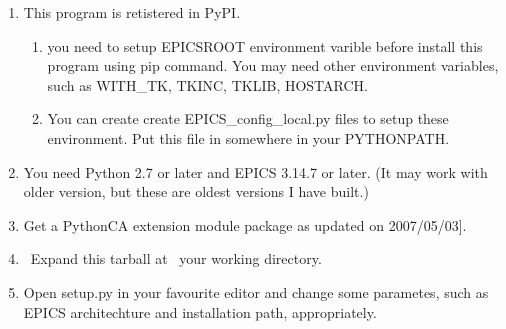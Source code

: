 \documentclass[a4paper,12pt,dvipdfmx]{sphinxhowto}
\begin{document}
\begin{enumerate}
%
\item {} 
\sphinxAtStartPar
This program is retistered in PyPI.
\begin{enumerate}
%
\item {} 
\sphinxAtStartPar
you need to setup EPICSROOT environment varible before install this program
using pip command. You may need other environment variables, such as WITH\_TK, TKINC, TKLIB, HOSTARCH.

\item {} 
\sphinxAtStartPar
You can create create EPICS\_config\_local.py files to setup these environment. Put this file in
somewhere in your PYTHONPATH.

\end{enumerate}

\item {} 
\sphinxAtStartPar
You need Python 2.7 or later and EPICS 3.14.7 or later. (It may work
with older version, but these are oldest versions I have built.)

\item {} 
\sphinxAtStartPar
Get a Python\sphinxhyphen{}CA extension module package as \sphinxhref{CaPython-1.10.tar.gz}{a tarball
here}{[}updated on 2007/05/03{]}.

\item {} 
\sphinxAtStartPar
 Expand this tarball at  your working directory.

\item {} 
\sphinxAtStartPar
Open setup.py in your favourite editor and change some parametes,
such as EPICS architechture and installation path, appropriately.

\begin{sphinxVerbatim}[commandchars=\\\{\}]
\end{sphinxVerbatim}

\begin{sphinxVerbatim}[commandchars=\\\{\}]
\end{sphinxVerbatim}


\end{enumerate}
\end{document}
